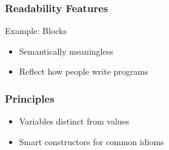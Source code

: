 \documentclass{beamer}
\begin{document}

\begin{frame}[fragile]

\frametitle{Readability Features}

Example: Blocks
\begin{itemize}
	\item Semantically meaningless
	\item Reflect how people write programs
\end{itemize}

\end{frame}


\begin{frame}

\frametitle{Principles}

\begin{itemize}
  \item Variables distinct from values
  \item Smart constructors for common idioms
\end{itemize}

\end{frame}

\end{document}

